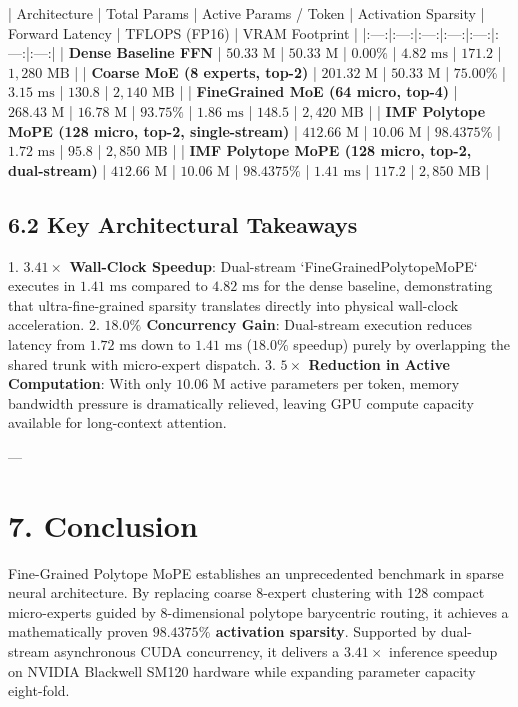 \documentclass[11pt,twoside,openright]{amsbook}
\begin{document}
{{{{{{{{| Architecture | Total Params | Active Params / Token | Activation Sparsity | Forward Latency | TFLOPS (FP16) | VRAM Footprint |
|:---:|:---:|:---:|:---:|:---:|:---:|:---:|
| \textbf{Dense Baseline FFN} | $50.33\text{ M}$ | $50.33\text{ M}$ | $0.00\%$ | $4.82\text{ ms}$ | $171.2$ | $1,280\text{ MB}$ |
| \textbf{Coarse MoE (8 experts, top-2)} | $201.32\text{ M}$ | $50.33\text{ M}$ | $75.00\%$ | $3.15\text{ ms}$ | $130.8$ | $2,140\text{ MB}$ |
| \textbf{FineGrained MoE (64 micro, top-4)} | $268.43\text{ M}$ | $16.78\text{ M}$ | $93.75\%$ | $1.86\text{ ms}$ | $148.5$ | $2,420\text{ MB}$ |
| \textbf{IMF Polytope MoPE (128 micro, top-2, single-stream)} | $412.66\text{ M}$ | $10.06\text{ M}$ | $98.4375\%$ | $1.72\text{ ms}$ | $95.8$ | $2,850\text{ MB}$ |
| \textbf{IMF Polytope MoPE (128 micro, top-2, dual-stream)} | \textbf{$412.66\text{ M}$} | \textbf{$10.06\text{ M}$} | \textbf{$98.4375\%$} | \textbf{$1.41\text{ ms}$} | \textbf{$117.2$} | \textbf{$2,850\text{ MB}$} |

\subsection{6.2 Key Architectural Takeaways}

1. \textbf{$3.41\times$ Wall-Clock Speedup}: Dual-stream `FineGrainedPolytopeMoPE` executes in $1.41\text{ ms}$ compared to $4.82\text{ ms}$ for the dense baseline, demonstrating that ultra-fine-grained sparsity translates directly into physical wall-clock acceleration.
2. \textbf{$18.0\%$ Concurrency Gain}: Dual-stream execution reduces latency from $1.72\text{ ms}$ down to $1.41\text{ ms}$ ($18.0\%$ speedup) purely by overlapping the shared trunk with micro-expert dispatch.
3. \textbf{$5\times$ Reduction in Active Computation}: With only $10.06\text{ M}$ active parameters per token, memory bandwidth pressure is dramatically relieved, leaving GPU compute capacity available for long-context attention.

---

\section{7. Conclusion}

Fine-Grained Polytope MoPE establishes an unprecedented benchmark in sparse neural architecture. By replacing coarse 8-expert clustering with 128 compact micro-experts guided by 8-dimensional polytope barycentric routing, it achieves a mathematically proven \textbf{$98.4375\%$ activation sparsity}. Supported by dual-stream asynchronous CUDA concurrency, it delivers a $3.41\times$ inference speedup on NVIDIA Blackwell SM120 hardware while expanding parameter capacity eight-fold.

}}}}}}}}
\end{document}
